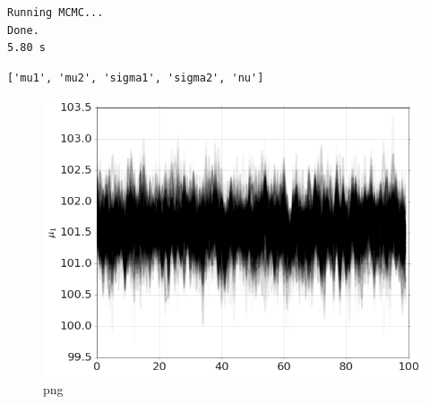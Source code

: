 \begin{Shaded}
\begin{Highlighting}[]
\end{Highlighting}
\end{Shaded}

\begin{verbatim}
Running MCMC...
Done.
5.80 s
\end{verbatim}

\begin{Shaded}
\begin{Highlighting}[]
\end{Highlighting}
\end{Shaded}

\begin{verbatim}
['mu1', 'mu2', 'sigma1', 'sigma2', 'nu']
\end{verbatim}

\begin{Shaded}
\begin{Highlighting}[]
\NormalTok{)}
\end{Highlighting}
\end{Shaded}

\begin{figure}[htbp]
\centering
\includegraphics{output_4_0.png}
\caption{png}
\end{figure}

\begin{Shaded}
\begin{Highlighting}[]
\NormalTok{)}
\end{Highlighting}
\end{Shaded}

